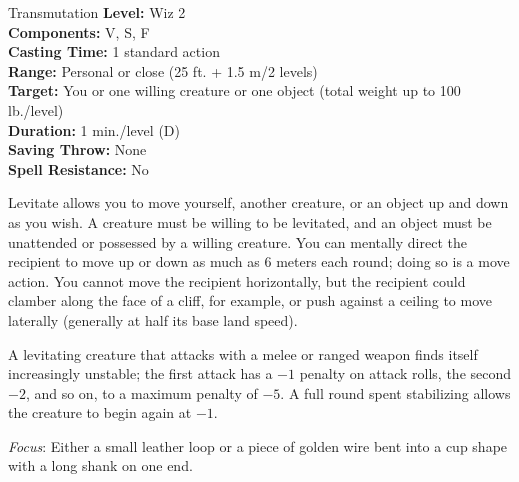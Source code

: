 {Transmutation}
{
	\textbf{Level:}
	Wiz 2\\
	\textbf{Components:}
	V, S, F\\
	\textbf{Casting Time:}
	1 standard action\\
	\textbf{Range:}
	Personal or close (25 ft. + 1.5 m/2 levels)\\
	\textbf{Target:}
	You or one willing creature or one object (total weight up to 100 lb./level)\\
	\textbf{Duration:}
	1 min./level (D)\\
	\textbf{Saving Throw:}
	None\\
	\textbf{Spell Resistance:}
	No\\
}
{
	Levitate allows you to move yourself, another creature, or an object up and down as you wish. A creature must be willing to be levitated, and an object must be unattended or possessed by a willing creature. You can mentally direct the recipient to move up or down as much as 6 meters each round; doing so is a move action. You cannot move the recipient horizontally, but the recipient could clamber along the face of a cliff, for example, or push against a ceiling to move laterally (generally at half its base land speed).

	A levitating creature that attacks with a melee or ranged weapon finds itself increasingly unstable; the first attack has a $-1$ penalty on attack rolls, the second $-2$, and so on, to a maximum penalty of $-5$. A full round spent stabilizing allows the creature to begin again at $-1$.

	\textit{Focus}:
	Either a small leather loop or a piece of golden wire bent into a cup shape with a long shank on one end.

}
